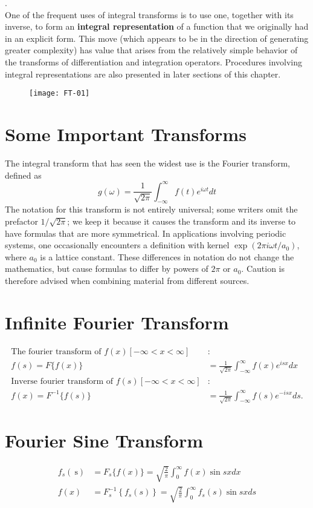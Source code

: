 .\\
One of the frequent uses of integral transforms is to use one, together with its inverse, to form an \textbf{integral representation} of a function that we originally had in an explicit form. This move (which appears to be in the direction of generating greater complexity) has value that arises from the relatively simple behavior of the transforms of differentiation and integration operators. Procedures involving integral representations are also presented in later sections of this chapter.
\begin{figure}[H]
	\centering
	\texttt{[image: FT-01]}
\end{figure}
\section{Some Important Transforms}
The integral transform that has seen the widest use is the Fourier transform, defined as
\begin{equation}
g(\omega)=\frac{1}{\sqrt{2 \pi}} \int_{-\infty}^{\infty} f(t) e^{i \omega t} d t
\end{equation}
The notation for this transform is not entirely universal; some writers omit the prefactor $1 / \sqrt{2 \pi}$; we keep it because it causes the transform and its inverse to have formulas that are more symmetrical. In applications involving periodic systems, one occasionally encounters a definition with kernel $\exp \left(2 \pi i \omega t / a_{0}\right)$, where $a_{0}$ is a lattice constant. These differences in notation do not change the mathematics, but cause formulas to differ by powers of $2 \pi$ or $a_{0}$. Caution is therefore advised when combining material from different sources.\\
\section{Infinite Fourier Transform}
\begin{align*}
\text{The fourier transform of }f(x)[-\infty<x<\infty] &:\\
f(s)=F\{f(x)\}&=\frac{1}{\sqrt{2 \pi}} \int_{-\infty}^{\infty} f(x) e^{i s x} d x\\
\text{Inverse fourier transform of }f(s)[-\infty<x<\infty] &:\\
f(x)=F^{-1}\{f(s)\}&=\frac{1}{\sqrt{2 \pi}} \int_{-\infty}^{\infty} f(s) e^{-i s x} d s .
\end{align*}
\section{Fourier Sine Transform}
\begin{align*}
f_{s}(\mathrm{~s})&=F_{s}\{f(x)\}=\sqrt{\frac{2}{\pi}} \int_{0}^{\infty} f(x) \sin s x d x \\
f(x)&=F_{s}^{-1}\left\{f_{s}(s)\right\}=\sqrt{\frac{2}{\pi}} \int_{0}^{\infty} f_{s}(s) \sin s x d s
\end{align*}
